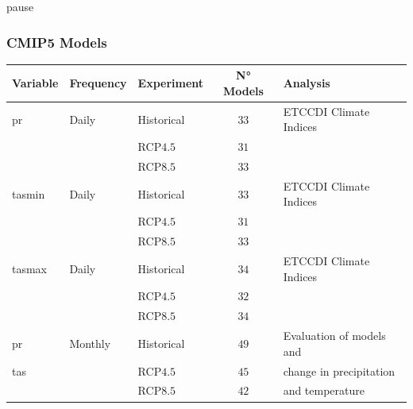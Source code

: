 \begin{frame}{pause}
      \frametitle{CMIP5 Models}
{\fontsize{10pt}{14}\selectfont

\centering
\begin{tabular}{lllcl}

\textbf{Variable}     &\textbf{Frequency}       &\textbf{Experiment}     & \textbf{N° Models}  & \textbf{Analysis}         \\ \hline
                                                                                                                           
pr                    & Daily                   & Historical             & $33$                  & ETCCDI Climate Indices    \\
                      &                         & RCP$4.5$               & $31$                  &                           \\
                      &                         & RCP$8.5$               & $33$                  &                           \pause \\
\hline                                                                                                                     
tasmin                & Daily                   & Historical             & $33$                  & ETCCDI Climate Indices    \\
                      &                         & RCP$4.5$               & $31$                  &                           \\
                      &                         & RCP$8.5$               & $33$                  &                           \\
\hline                                                                                                                     
tasmax                & Daily                   & Historical             & $34$                  & ETCCDI Climate Indices    \\
                      &                         & RCP$4.5$               & $32$                  &                           \\
                      &                         & RCP$8.5$               & $34$                  &                           \pause \\
                                                                                                                           
\hline                                                                                                                     
pr                    & Monthly                 & Historical             & $49$                  & Evaluation of models and  \\   
tas                   &                         & RCP$4.5$               & $45$                  & change in precipitation   \\
                      &                         & RCP$8.5$               & $42$                  & and temperature           \\

\end{tabular}
}
\end{frame}